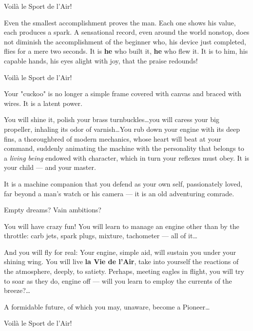 \documentclass{book}
\begin{document}
{
  \selectfont
  \begin{center}
    {\Large Voil\`a le Sport de l'Air!}
  \end{center}
}

Even the smallest accomplishment proves the man.  Each one shows his
value, each produces a spark. A sensational record, even around the
world nonstop, does not diminish the accomplishment of the beginner
who, his device just completed, flies for a mere two seconds.  It is
\textbf{he} who built it, \textbf{he} who flew it.  It is to him, his
capable hands, his eyes alight with joy, that the praise redounds!

{
  \selectfont
  \begin{center}
    {\huge Voil\`a le Sport de l'Air!}
  \end{center}
}

Your "cuckoo" is no longer a simple frame covered with canvas and
braced with wires. It is a latent power.

You will shine it, polish your brass turnbuckles\ldots you will caress
your big propeller, inhaling its odor of varnish\ldots You rub down
your engine with its deep fins, a thoroughbred of modern mechanics,
whose heart will beat at your command, suddenly animating the machine
with the personality that belongs to a \textit{living being} endowed
with character, which in turn your reflexes must obey. It is your
child --- and your master.

It is a machine companion that you defend as your own self,
passionately loved, far beyond a man's watch or his camera --- it is
an old adventuring comrade.

Empty dreams?  Vain ambitions?

You will have crazy fun! You will learn to manage an engine other than
by the throttle: carb jets, spark plugs, mixture, tachometer --- all
of it\ldots

And you will fly for real: Your engine, simple aid, will sustain you
under your shining wing. You will live \textbf{la Vie de l'Air}, take
into yourself the reactions of the atmosphere, deeply, to satiety.
Perhaps, meeting eagles in flight, you will try to soar as they do,
engine off --- will you learn to employ the currents of the
breeze?\ldots

A formidable future, of which you may, unaware, become a Pioneer\ldots

{
  \selectfont
  \begin{center}
    {\Huge Voil\`a le Sport de l'Air!}
  \end{center}
}
\end{document}
